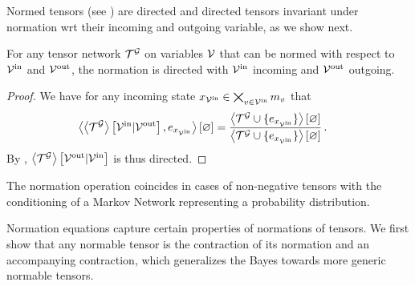 Normed tensors (see ) are directed and directed tensors invariant under normation wrt their incoming and outgoing variable, as we show next.

\begin{theorem}
    \label{the:normationDirected}
    For any tensor network $\mathcal{T}^{\mathcal{G}}$ on variables $\mathcal{V}$ that can be normed with respect to $\mathcal{V}^{\mathrm{in}}$ and $\mathcal{V}^{\mathrm{out}}$, the normation is directed with $\mathcal{V}^{\mathrm{in}}$ incoming and $\mathcal{V}^{\mathrm{out}}$ outgoing.
\end{theorem}
\begin{proof}
    We have for any incoming state ${x_{\mathcal{V}^{\mathrm{in}}}\in\bigtimes_{v\in\mathcal{V}^{\mathrm{in}}}m_{v}}$ that
    \begin{align*}
        \left\langle \left\langle \mathcal{T}^{\mathcal{G}}\right\rangle \left[ \mathcal{V}^{\mathrm{in}} | \mathcal{V}^{\mathrm{out}} \right], e_{x_{\mathcal{V}^{\mathrm{in}}}}\right\rangle \left[ \varnothing \right]
        & =  \frac{
            \left\langle \mathcal{T}^{\mathcal{G}}\cup\{e_{x_{\mathcal{V}^{\mathrm{in}}}}\}\right\rangle \left[ \varnothing \right]
        }{
            \left\langle \mathcal{T}^{\mathcal{G}}\cup\{e_{x_{\mathcal{V}^{\mathrm{in}}}}\}\right\rangle \left[ \varnothing \right]
        } \, .
    \end{align*}
    By , $\left\langle \mathcal{T}^{\mathcal{G}}\right\rangle \left[ \mathcal{V}^{\mathrm{out}} | \mathcal{V}^{\mathrm{in}} \right]$ is thus directed.
\end{proof}

The normation operation coincides in cases of non-negative tensors with the conditioning of a Markov Network representing a probability distribution.


Normation equations capture certain properties of normations of tensors.
We first show that any normable tensor is the contraction of its normation and an accompanying contraction, which generalizes the Bayes  towards more generic normable tensors.

